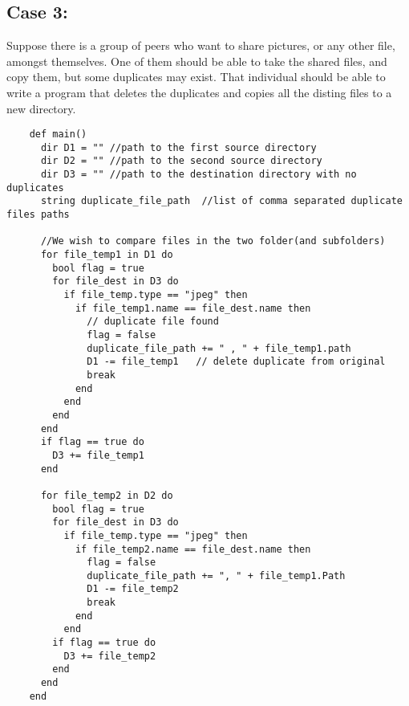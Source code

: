 \documentclass[11pt]{article}
\begin{document}
\newpage
\subsection{Case 3:}
Suppose there is a group of peers who want to share pictures, or any other file, amongst themselves. One of them should be able to take the shared files, and copy them, but some duplicates may exist. That individual should be able to write a program that deletes the duplicates and copies all the disting files to a new directory.
\begin{listing}[H]
  \begin{verbatim}
    def main()
      dir D1 = "" //path to the first source directory
      dir D2 = "" //path to the second source directory
      dir D3 = "" //path to the destination directory with no duplicates
      string duplicate_file_path  //list of comma separated duplicate files paths

      //We wish to compare files in the two folder(and subfolders)
      for file_temp1 in D1 do
        bool flag = true
        for file_dest in D3 do
          if file_temp.type == "jpeg" then
            if file_temp1.name == file_dest.name then
              // duplicate file found
              flag = false
              duplicate_file_path += " , " + file_temp1.path
              D1 -= file_temp1   // delete duplicate from original
              break
            end
          end
        end
      end
      if flag == true do
        D3 += file_temp1
      end

      for file_temp2 in D2 do
        bool flag = true
        for file_dest in D3 do
          if file_temp.type == "jpeg" then
            if file_temp2.name == file_dest.name then
              flag = false
              duplicate_file_path += ", " + file_temp1.Path
              D1 -= file_temp2
              break
            end
          end
        if flag == true do
          D3 += file_temp2
        end
      end
    end
  \end{verbatim}
\end{listing}

\newpage
\end{document}
